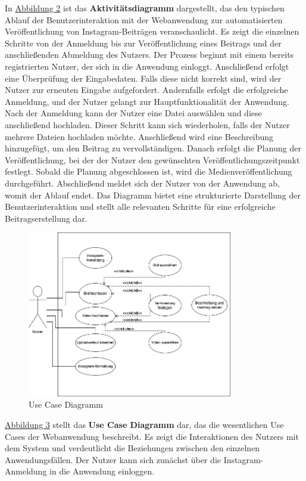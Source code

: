 In \hyperref[fig:fig-2]{Abbildung 2} ist das \textbf{Aktivitätsdiagramm} dargestellt, das den typischen Ablauf der Benutzerinteraktion mit der Webanwendung zur 
automatisierten Veröffentlichung von Instagram-Beiträgen veranschaulicht. Es zeigt die einzelnen Schritte von der Anmeldung bis zur Veröffentlichung eines Beitrags 
und der anschließenden Abmeldung des Nutzers. Der Prozess beginnt mit einem bereits registrierten Nutzer, der sich in die Anwendung einloggt. Anschließend erfolgt 
eine Überprüfung der Eingabedaten. Falls diese nicht korrekt sind, wird der Nutzer zur erneuten Eingabe aufgefordert. Andernfalls erfolgt die erfolgreiche Anmeldung, 
und der Nutzer gelangt zur Hauptfunktionalität der Anwendung. Nach der Anmeldung kann der Nutzer eine Datei auswählen und diese anschließend hochladen. Dieser Schritt 
kann sich wiederholen, falls der Nutzer mehrere Dateien hochladen möchte. Anschließend wird eine Beschreibung hinzugefügt, um den Beitrag zu vervollständigen. Danach 
erfolgt die Planung der Veröffentlichung, bei der der Nutzer den gewünschten Veröffentlichungszeitpunkt festlegt. Sobald die Planung abgeschlossen ist, wird die 
Medienveröffentlichung durchgeführt. Abschließend meldet sich der Nutzer von der Anwendung ab, womit der Ablauf endet. Das Diagramm bietet eine strukturierte 
Darstellung der Benutzerinteraktion und stellt alle relevanten Schritte für eine erfolgreiche Beitragserstellung dar.

\begin{figure}[htb]
    \centering
    \includegraphics[width=0.8\textwidth]{graphics/use_case_diagram.png}
    \caption{Use Case Diagramm}
    \label{fig:fig-3}
\end{figure}

\hyperref[fig:fig-3]{Abbildung 3} stellt das \textbf{Use Case Diagramm} dar, das die wesentlichen Use Cases der Webanwendung beschreibt. Es zeigt die Interaktionen 
des Nutzers mit dem System und verdeutlicht die Beziehungen zwischen den einzelnen Anwendungsfällen. Der Nutzer kann sich zunächst über die Instagram-Anmeldung in 
die Anwendung einloggen.

